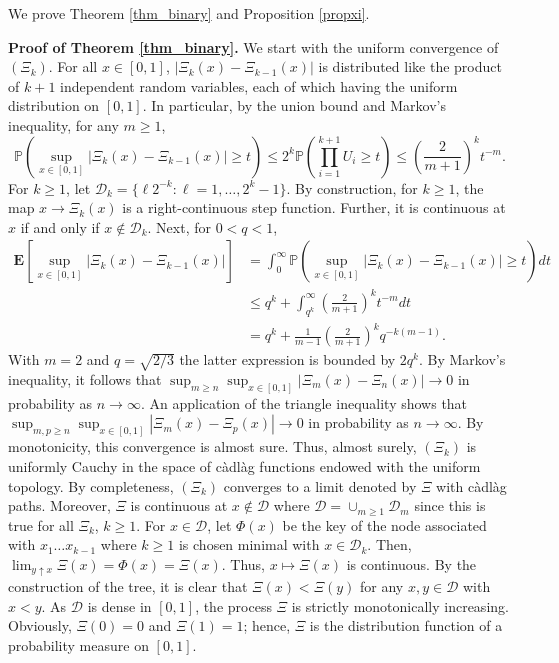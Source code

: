 \documentclass{amsart}       %
\newcommand{\E}[1]{\ensuremath{\mathbf{E} \left[#1 \right]}}
\newcommand{\Prob}[1]{\ensuremath{\mathbb{P} \left(#1 \right)}}
\begin{document}
We prove Theorem \ref{thm_binary} and Proposition \ref{propxi}.

\medskip \textbf{Proof of Theorem \ref{thm_binary}.} We start with the uniform convergence of $(\Xi_k)$. 
For all $x \in [0,1]$, $|\Xi_k(x) - \Xi_{k-1}(x)|$ is distributed like the product of $k+1$ independent random variables, each of which having the uniform distribution on $[0,1]$. In particular, by the union bound and Markov's inequality, for any $m \geq 1$,
$$\Prob{ \sup_{x \in [0,1]} |\Xi_k(x) - \Xi_{k-1}(x)| \geq t} \leq 2^k \Prob{ \prod_{i=1}^{k+1} U_i \geq t} \leq \left(\frac{2}{m+1}\right)^{k} t^{-m}.$$
For $k \geq 1$, let $\mathcal{D}_k = \{\ell 2^{-k}: \ell = 1, \ldots, 2^k - 1\}$.
By construction, for $k \geq 1$, the map $x \to \Xi_k(x)$ is a right-continuous step function. Further, it is continuous at $x$ if and only if $x \notin \mathcal{D}_k$. Next,  for $0 < q < 1$,
\begin{align*}
\E{ \sup_{x \in [0,1]} |\Xi_k(x) - \Xi_{k-1}(x)| } & = \int_0^\infty \Prob{ \sup_{x \in [0,1]} |\Xi_k(x) - \Xi_{k-1}(x)| \geq t} dt \\
& \leq q^k + \int_{q^k}^\infty \left(\frac{2}{m+1}\right)^{k} t^{-m} dt \\
& = q^k +  \frac{1}{m-1}\left(\frac{2}{m+1}\right)^{k} q^{-k(m-1)}.
\end{align*}
With $m=2$ and $q = \sqrt{2/3}$ the latter expression is bounded by $2 q^k$. By Markov's inequality, it follows that $\sup_{m \geq n} \sup_{x \in [0,1]} |\Xi_m(x) - \Xi_{n}(x)| \to 0$ 
in probability as $n \to \infty$.  An application of the triangle inequality shows that
$\sup_{m, p \geq n} \sup_{x \in [0,1]} |\Xi_m(x) - \Xi_{p}(x)| \to 0$ in probability as $n \to \infty$. By monotonicity, this convergence is almost sure.
Thus, almost surely,  $(\Xi_k)$ is uniformly Cauchy in the space 
of c{\`a}dl{\`a}g functions endowed with the uniform topology. 
By completeness,  $(\Xi_k)$ converges to a limit denoted by $\Xi$ with c{\`a}dl{\`a}g paths. Moreover, $\Xi$ is continuous at
$x \notin \mathcal{D}$ where $\mathcal D = \cup_{m \geq 1} \mathcal{D}_m$ since this is true for all $\Xi_k$, $k \geq 1$. For $x \in \mathcal{D}$, let $\Phi(x)$ be the key of the node associated with $x_1 \ldots x_{k-1}$ where $k \geq 1$ is chosen minimal with $x \in \mathcal{D}_k$. Then, 
$\lim_{y \uparrow x} \Xi(x) = \Phi(x) = \Xi(x).$
Thus, $x \mapsto \Xi(x)$ is continuous. By the construction of the tree, it is clear that $\Xi(x) < \Xi(y)$ for any $x, y \in \mathcal{D}$ with 
$x < y$. As $\mathcal{D}$ is dense in $[0,1]$, the process $\Xi$ is strictly monotonically increasing. Obviously, $\Xi(0) = 0$ and $\Xi(1) = 1$; 
hence, $\Xi$ is the distribution function of a probability measure on $[0,1]$. 
\end{document}
